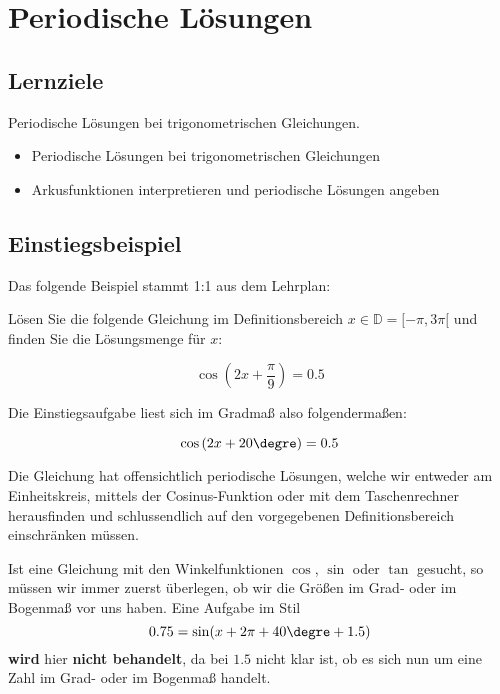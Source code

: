 
\section{Periodische Lösungen}

\subsection*{Lernziele}

Periodische Lösungen bei trigonometrischen Gleichungen.

\begin{itemize}
\item Periodische Lösungen bei trigonometrischen Gleichungen
\item Arkusfunktionen interpretieren und periodische Lösungen angeben
\end{itemize}



\subsection{Einstiegsbeispiel}
Das folgende Beispiel stammt 1:1 aus dem Lehrplan:

Lösen Sie die folgende Gleichung im Definitionsbereich $x \in \mathbb{D} = [ -\pi, 3\pi[$ und finden Sie die Lösungsmenge für $x$:

$$\cos\left(2x+\frac{\pi}{9}\right) = 0.5$$

Die Einstiegsaufgabe liest sich im Gradmaß also folgendermaßen:

$$\cos\left(2x+20\degre\right) = 0.5$$

Die Gleichung hat offensichtlich periodische Lösungen, welche wir entweder am Einheitskreis, mittels der Cosinus-Funktion oder mit dem Taschenrechner herausfinden und schlussendlich auf den vorgegebenen Definitionsbereich einschränken müssen.


\begin{bemerkung}{}{}
  Ist eine Gleichung mit den Winkelfunktionen $\cos$, $\sin$ oder $\tan$ gesucht, so müssen wir immer zuerst überlegen, ob wir die Größen im Grad- oder im Bogenmaß vor uns haben. Eine Aufgabe im Stil $$0.75 = \sin(x + 2\pi + 40\degre + 1.5)$$ \textbf{wird} hier \textbf{nicht behandelt}, da bei $1.5$ nicht klar ist, ob es sich nun um eine Zahl im Grad- oder im Bogenmaß handelt.
\end{bemerkung}%
\newpage


